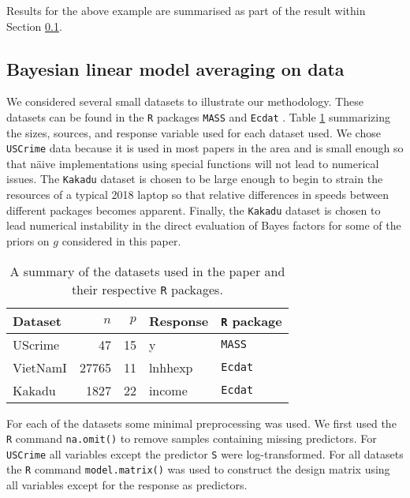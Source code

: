 \noindent Results for the above example are summarised as part of the result
within Section \ref{sec:BLMA}.

\subsection{Bayesian linear model averaging on data}\label{sec:BLMA}

We considered several small datasets to illustrate our methodology. These
datasets can be found in the {\tt R} packages {\tt MASS} \citep{Venables2002}
and {\tt Ecdat} \citep{Croissant2016}. Table \ref{tab:g_prior_datasets}
summarizing the sizes,  sources, and response variable used for each dataset
used.  We chose {\tt USCrime} data because it is used in most papers in the
area and is small enough so that n\"aive implementations using special
functions will not lead to numerical issues. The 
{\tt Kakadu} dataset is chosen to be large enough to begin to strain the
resources of a typical 2018 laptop so that relative differences in speeds
between different packages becomes apparent. Finally, the {\tt Kakadu} dataset
is chosen to lead numerical instability in the direct evaluation of Bayes
factors for some of the priors on $g$ considered in this paper.

\begin{table}[h]
	\begin{center}
		\begin{tabular}{l|r|r|l|l}
			Dataset	& $n$ & $p$ & Response & {\tt R} package \\ 
			\hline 
			UScrime 	& 47 & 15 & y & {\tt MASS} \\  
			VietNamI	& 27765 & 11 & lnhhexp & {\tt Ecdat}  \\ 
			Kakadu	& 1827 & 22 & income & {\tt Ecdat}   \\  
		\end{tabular} 
	\end{center}
	\caption{A summary of the datasets used in the paper and their respective {\tt R} packages.}
	\label{tab:g_prior_datasets}
\end{table}

For each of the datasets some minimal preprocessing was used.  We first used
the {\tt R} command {\tt na.omit()} to remove samples containing missing
predictors.  For {\tt USCrime} all variables except the predictor {\tt S} were
log-transformed. For all datasets the {\tt R} command {\tt model.matrix()} was
used to construct the design matrix using all variables except for the response
as predictors.

